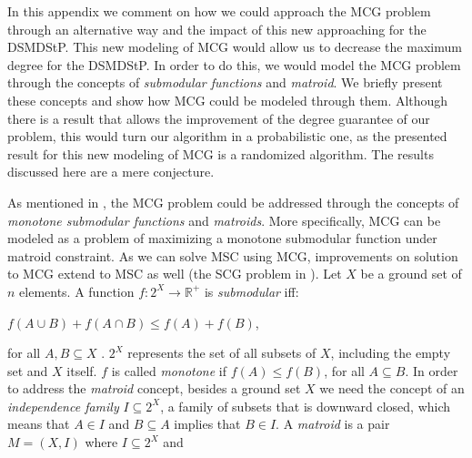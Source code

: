 \label{sec:matroid}

In this appendix we comment on how we could approach the MCG problem through an alternative way and the impact of this new approaching for the DSMDStP. 
This new modeling of MCG would allow us to decrease the maximum degree for the DSMDStP. 
In order to do this, we would model 
the MCG problem through the concepts of \emph{submodular functions} and \emph{matroid}. We briefly present these concepts and show how MCG could 
be modeled through them. Although there is a result that allows the improvement of the degree guarantee of our problem, this would turn our algorithm in 
a probabilistic one, as the presented result for this new modeling of MCG is a randomized algorithm. 
The results discussed here are a mere conjecture.

As mentioned in \cite{Calinescu2011}, the MCG problem \cite{Chekuri2004} could be addressed through the concepts of \emph{monotone submodular functions} and 
\emph{matroids}. More specifically, MCG can be modeled as a problem of maximizing a monotone submodular function under matroid constraint. 
As we can solve MSC using MCG, improvements on solution to MCG extend to MSC as well \cite{Elkin2006} (the SCG problem in \cite{Chekuri2004}). Let $X$ be a ground set of $n$ elements. A function $f: 2^{X} \rightarrow \mathbb{R}^+$ is \emph{submodular} iff: 

\begin{center}
$f(A \cup B) + f(A \cap B) \le f(A) + f(B)$,
\end{center}

for all $A,B \subseteq X$ \cite{Schrijver2003}. $2^X$ represents the set of all subsets of $X$, including the empty set and $X$ itself. 
$f$ is called \emph{monotone} if $f(A) \le f(B)$, for all $A \subseteq B$. In order to address the \emph{matroid} 
concept, besides a ground set $X$ we need the concept of an \emph{independence family} $I \subseteq 2^{X}$, a family of subsets that is downward closed, which 
means that $A \in I$ and $B \subseteq A$ implies that $B \in I$. A \emph{matroid} is a pair $M = (X,I)$ where $I \subseteq 2^{X}$ and

